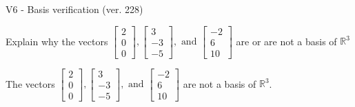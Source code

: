 \begin{exercise}
  \begin{exerciseTitle}V6 - Basis verification (ver. 228)\end{exerciseTitle}
  \begin{exerciseStatement}
    Explain why the vectors \(\left[\begin{array}{r}
2 \\
0 \\
0
\end{array}\right] , \left[\begin{array}{r}
3 \\
-3 \\
-5
\end{array}\right] , \text{ and } \left[\begin{array}{r}
-2 \\
6 \\
10
\end{array}\right]\) are or are not a basis of \(\mathbb{R}^3\)	


  \end{exerciseStatement}
  \begin{exerciseAnswer}
   The vectors \(\left[\begin{array}{r}
2 \\
0 \\
0
\end{array}\right] , \left[\begin{array}{r}
3 \\
-3 \\
-5
\end{array}\right] , \text{ and } \left[\begin{array}{r}
-2 \\
6 \\
10
\end{array}\right]\) 
  	 are not  a basis of \(\mathbb{R}^3\).
  


  \end{exerciseAnswer}
\end{exercise}